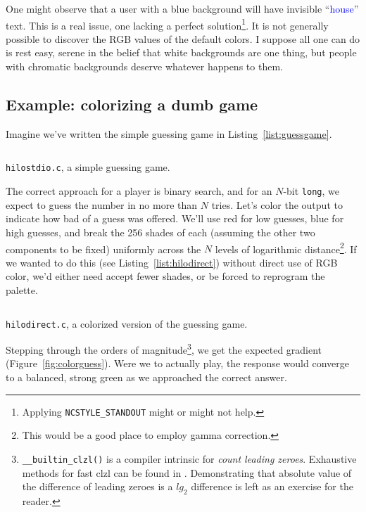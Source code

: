 \documentclass[letterpaper,10pt]{article}
\begin{document}
One might observe that a user with a blue background will have invisible
``\textcolor{blue}{house}'' text. This is a real issue, one lacking a perfect
solution\footnote{Applying \texttt{NCSTYLE\_STANDOUT} might or might not help.}.
It is not generally possible to discover the RGB values of the default colors.
I suppose all one can do is rest easy, serene in the belief that white
backgrounds are one thing, but people with chromatic backgrounds deserve
whatever happens to them.

\subsection{Example: colorizing a dumb game}
Imagine we've written the simple guessing game in Listing~\ref{list:guessgame}.

\begin{listing}[!htbp]
\inputminted[]{C}{code/hilostdio.c}
\caption{\texttt{hilostdio.c}, a simple guessing game.}
\label{list:guessgame}
\end{listing}

The correct approach for a player is binary search, and for an $N$-bit
\texttt{long}, we expect to guess the number in no more than $N$ tries. Let's
color the output to indicate how bad of a guess was offered. We'll use red for
low guesses, blue for high guesses, and break the 256 shades of each (assuming
the other two components to be fixed) uniformly across the $N$ levels of
logarithmic distance\footnote{This would be a good place to employ \gls{gamma correction}.}.
If we wanted to do this (see Listing~\ref{list:hilodirect}) without direct use of RGB color,
we'd either need accept fewer shades, or be forced to reprogram the palette.

\begin{listing}[!htbp]
\inputminted[]{C}{code/hilodirect.c}
\caption{\texttt{hilodirect.c}, a colorized version of the guessing game.}
\label{list:hilodirect}
\end{listing}

Stepping through the orders of magnitude\footnote{\texttt{\_\_builtin\_clzl()}
is a compiler intrinsic for \textit{count leading zeroes}. Exhaustive methods
for fast clzl can be found in \cite{hackerdelight}. Demonstrating that
absolute value of the difference of leading zeroes is a $lg_{2}$ difference
is left as an exercise for the reader.}, we get the expected gradient
(Figure~\ref{fig:colorguess}). Were we to actually play, the response would
converge to a balanced, strong green as we approached the correct answer.
\end{document}
